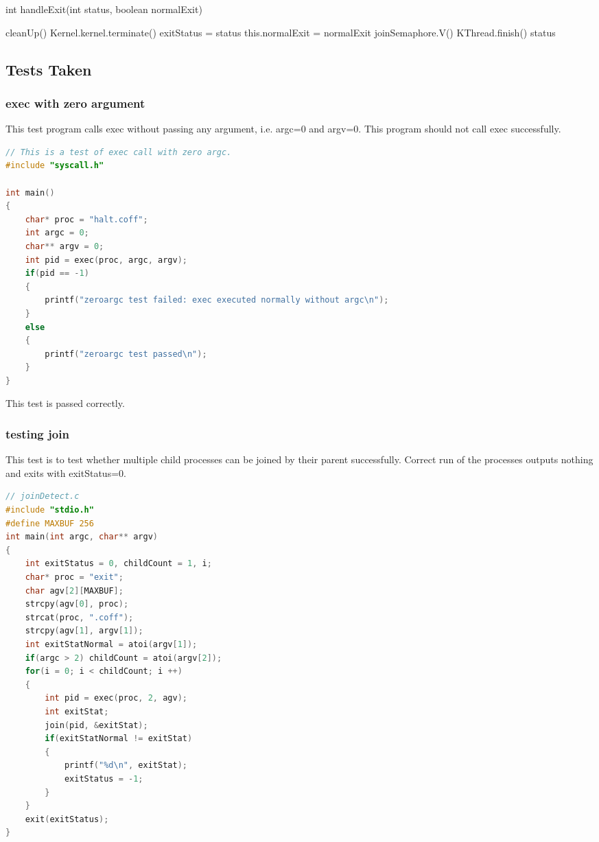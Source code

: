 \documentclass{article}
\begin{document}
\begin{spacing}{1.1}
\begin{algorithm}
  \label{alg:handleExit}
  \caption{int \textsf{handleExit}(int status, boolean normalExit)}
  \textsf{cleanUp}()\;
   {
    Kernel.kernel.terminate()\;
  }
  exitStatus = status\;
  this.normalExit = normalExit\;
  joinSemaphore.V()\;
  \colorbox{myyellow}{KThread.finish()}\;
  \Return status\;
\end{algorithm}

\subsection{Tests Taken}
\subsubsection{\textsf{exec} with zero argument}
This test program calls \textsf{exec} without passing any argument, i.e. \textsf{argc}=0 and \textsf{argv}=0. This program should not call \textsf{exec} successfully.
\begin{lstlisting}[language=C]
// This is a test of exec call with zero argc.
#include "syscall.h"

int main()
{
    char* proc = "halt.coff";
    int argc = 0;
    char** argv = 0;
    int pid = exec(proc, argc, argv);
    if(pid == -1)
    {
        printf("zeroargc test failed: exec executed normally without argc\n");
    }
    else
    {
        printf("zeroargc test passed\n");
    }
}
\end{lstlisting}
This test is passed correctly.
\subsubsection{testing \textsf{join}}
This test is to test whether multiple child processes can be joined by their parent successfully. Correct run of the processes outputs nothing and exits with \textsf{exitStatus}=0.
\begin{lstlisting}[language=C]
// joinDetect.c
#include "stdio.h"
#define MAXBUF 256
int main(int argc, char** argv)
{
    int exitStatus = 0, childCount = 1, i;
    char* proc = "exit";
    char agv[2][MAXBUF];
    strcpy(agv[0], proc);
    strcat(proc, ".coff");
    strcpy(agv[1], argv[1]);
    int exitStatNormal = atoi(argv[1]);
    if(argc > 2) childCount = atoi(argv[2]);
    for(i = 0; i < childCount; i ++)
    {
        int pid = exec(proc, 2, agv);
        int exitStat;
        join(pid, &exitStat);
        if(exitStatNormal != exitStat)
        {
            printf("%d\n", exitStat);
            exitStatus = -1;
        }
    }
    exit(exitStatus);
}


\end{lstlisting}
\end{spacing}
\end{document}
